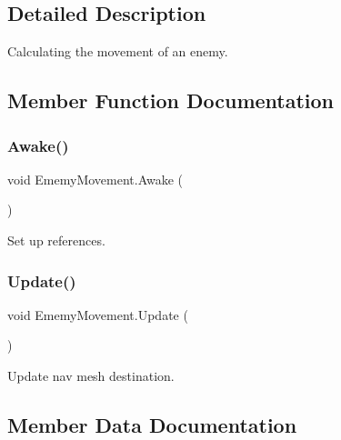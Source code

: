 \subsection{Detailed Description}
Calculating the movement of an enemy. 

\subsection{Member Function Documentation}
\mbox{\label{class_ememy_movement_a4ec892e04366d0831a320492478a1e98}} 
\subsubsection{\texorpdfstring{Awake()}{Awake()}}
{\footnotesize\ttfamily void Ememy\+Movement.\+Awake (\begin{DoxyParamCaption}{ }\end{DoxyParamCaption})\hspace{0.3cm}{\ttfamily [private]}}



Set up references. 

\mbox{\label{class_ememy_movement_a484abcd81c0d70758b4b6aa399de705d}} 
\subsubsection{\texorpdfstring{Update()}{Update()}}
{\footnotesize\ttfamily void Ememy\+Movement.\+Update (\begin{DoxyParamCaption}{ }\end{DoxyParamCaption})\hspace{0.3cm}{\ttfamily [private]}}



Update nav mesh destination. 



\subsection{Member Data Documentation}
\mbox{\label{class_ememy_movement_a1ef0ecd0fd5e778ad644773edc24cc48}} 
